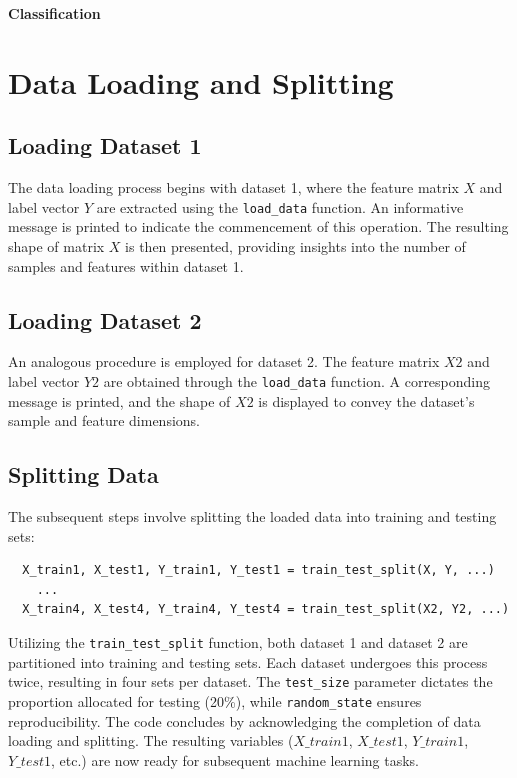\documentclass{article}
\begin{document}
\begin{titlepage}
  \begin{center}
    {\Huge\bfseries Classification\par}
  \end{center}
  \vspace{2cm}

  \section{Data Loading and Splitting}

  \subsection{Loading Dataset 1}
  The data loading process begins with dataset 1, where the feature matrix \(X\) and label vector \(Y\) are extracted using the \texttt{load\_data} function. An informative message is printed to indicate the commencement of this operation. The resulting shape of matrix \(X\) is then presented, providing insights into the number of samples and features within dataset 1.

  \subsection{Loading Dataset 2}
  An analogous procedure is employed for dataset 2. The feature matrix \(X2\) and label vector \(Y2\) are obtained through the \texttt{load\_data} function. A corresponding message is printed, and the shape of \(X2\) is displayed to convey the dataset's sample and feature dimensions.

  \subsection{Splitting Data}
  The subsequent steps involve splitting the loaded data into training and testing sets:

  \begin{verbatim}
  X_train1, X_test1, Y_train1, Y_test1 = train_test_split(X, Y, ...)
    ...
  X_train4, X_test4, Y_train4, Y_test4 = train_test_split(X2, Y2, ...)
  \end{verbatim}

  Utilizing the \texttt{train\_test\_split} function, both dataset 1 and dataset 2 are partitioned into training and testing sets. Each dataset undergoes this process twice, resulting in four sets per dataset.
  The \texttt{test\_size} parameter dictates the proportion allocated for testing (20\%), while \texttt{random\_state} ensures reproducibility.
  \newline
  \newline
  The code concludes by acknowledging the completion of data loading and splitting.
  \newline
  \newline
  The resulting variables (\(X\_train1\), \(X\_test1\), \(Y\_train1\), \(Y\_test1\), etc.) are now ready for subsequent machine learning tasks.

\end{titlepage}
\end{document}
